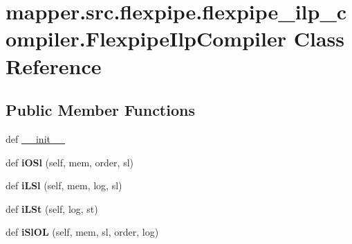 \hypertarget{classmapper_1_1src_1_1flexpipe_1_1flexpipe__ilp__compiler_1_1_flexpipe_ilp_compiler}{}\section{mapper.\+src.\+flexpipe.\+flexpipe\+\_\+ilp\+\_\+compiler.\+Flexpipe\+Ilp\+Compiler Class Reference}
\label{classmapper_1_1src_1_1flexpipe_1_1flexpipe__ilp__compiler_1_1_flexpipe_ilp_compiler}
\subsection*{Public Member Functions}
\begin{DoxyCompactItemize}
\item 
def \hyperlink{classmapper_1_1src_1_1flexpipe_1_1flexpipe__ilp__compiler_1_1_flexpipe_ilp_compiler_a52e987ed7b57b77cae021946ca39f113}{\+\_\+\+\_\+init\+\_\+\+\_\+}
\item 
\hypertarget{classmapper_1_1src_1_1flexpipe_1_1flexpipe__ilp__compiler_1_1_flexpipe_ilp_compiler_a0a5d6af0bcbb52097574ce4c11ef2cd9}{}def {\bfseries i\+O\+Sl} (self, mem, order, sl)\label{classmapper_1_1src_1_1flexpipe_1_1flexpipe__ilp__compiler_1_1_flexpipe_ilp_compiler_a0a5d6af0bcbb52097574ce4c11ef2cd9}

\item 
\hypertarget{classmapper_1_1src_1_1flexpipe_1_1flexpipe__ilp__compiler_1_1_flexpipe_ilp_compiler_a562325b33a9b14c79b43092ac569cca1}{}def {\bfseries i\+L\+Sl} (self, mem, log, sl)\label{classmapper_1_1src_1_1flexpipe_1_1flexpipe__ilp__compiler_1_1_flexpipe_ilp_compiler_a562325b33a9b14c79b43092ac569cca1}

\item 
\hypertarget{classmapper_1_1src_1_1flexpipe_1_1flexpipe__ilp__compiler_1_1_flexpipe_ilp_compiler_ad0ebfa9eef507cc7ce69052102eaa2f1}{}def {\bfseries i\+L\+St} (self, log, st)\label{classmapper_1_1src_1_1flexpipe_1_1flexpipe__ilp__compiler_1_1_flexpipe_ilp_compiler_ad0ebfa9eef507cc7ce69052102eaa2f1}

\item 
\hypertarget{classmapper_1_1src_1_1flexpipe_1_1flexpipe__ilp__compiler_1_1_flexpipe_ilp_compiler_ad5dd36439ccc8145ae06ce356bae7a29}{}def {\bfseries i\+Sl\+O\+L} (self, mem, sl, order, log)\label{classmapper_1_1src_1_1flexpipe_1_1flexpipe__ilp__compiler_1_1_flexpipe_ilp_compiler_ad5dd36439ccc8145ae06ce356bae7a29}


\end{DoxyCompactItemize}
